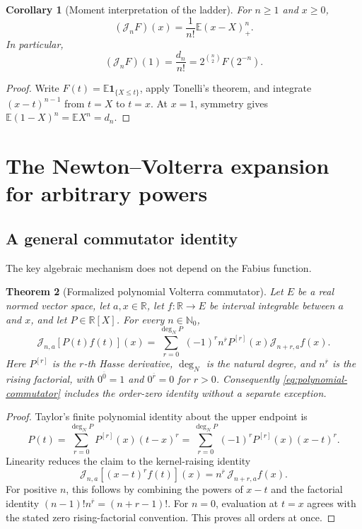 \documentclass[11pt,oneside]{article}
\newtheorem{theorem}{Theorem}[section]
\newtheorem{corollary}[theorem]{Corollary}
\theoremstyle{definition}
\theoremstyle{remark}
\newcommand{\E}{\mathbb E}
\newcommand{\R}{\mathbb R}
\newcommand{\N}{\mathbb N}
\newcommand{\rise}[2]{#1^{\overline{#2}}}
\newcommand{\Jn}{\mathcal J}
\newcommand{\1}{\mathbf 1}
\begin{document}
\begin{corollary}[Moment interpretation of the ladder]\label{cor:J-moment}
For \(n\geq1\) and \(x\geq0\),
\begin{equation}
 (\Jn_nF)(x)=\frac1{n!}\E (x-X)_+^n.                            \label{eq:J-stoploss}
\end{equation}
In particular,
\begin{equation}
 (\Jn_nF)(1)=\frac{d_n}{n!}
 =2^{\binom n2}F(2^{-n}).                                      \label{eq:J-one}
\end{equation}
\end{corollary}

\begin{proof}
Write \(F(t)=\E\1_{\{X\leq t\}}\), apply Tonelli's theorem, and integrate
\((x-t)^{n-1}\) from \(t=X\) to \(t=x\).  At \(x=1\), symmetry gives
\(\E(1-X)^n=\E X^n=d_n\).
\end{proof}

\section{The Newton--Volterra expansion for arbitrary powers}

\subsection{A general commutator identity}
The key algebraic mechanism does not depend on the Fabius function.

\begin{theorem}[Formalized polynomial Volterra commutator]
\label{thm:polynomial-commutator}
Let \(E\) be a real normed vector space, let \(a,x\in\R\), let
\(f:\R\to E\) be interval integrable between \(a\) and \(x\), and let
\(P\in\R[X]\).  For every \(n\in\N_0\),
\begin{equation}
 \boxed{\quad
 \Jn_{n,a}[P(t)f(t)](x)
 =\sum_{r=0}^{\deg_{\!N}P}(-1)^r\rise nr P^{[r]}(x)
   \Jn_{n+r,a}f(x).
 \quad}                                                       \label{eq:polynomial-commutator}
\end{equation}
Here \(P^{[r]}\) is the \(r\)-th Hasse derivative,
\(\deg_{\!N}\) is the natural degree, and \(\rise nr\) is the rising
factorial, with \(\rise 00=1\) and \(\rise 0r=0\) for \(r>0\).
Consequently \eqref{eq:polynomial-commutator} includes the order-zero
identity without a separate exception.
\end{theorem}

\begin{proof}
Taylor's finite polynomial identity about the upper endpoint is
\[
 P(t)=\sum_{r=0}^{\deg_{\!N}P}P^{[r]}(x)(t-x)^r
     =\sum_{r=0}^{\deg_{\!N}P}(-1)^rP^{[r]}(x)(x-t)^r.
\]
Linearity reduces the claim to the kernel-raising identity
\[
 \Jn_{n,a}[(x-t)^rf(t)](x)=\rise nr\,\Jn_{n+r,a}f(x).
\]
For positive \(n\), this follows by combining the powers of \(x-t\) and the
factorial identity \((n-1)!\rise nr=(n+r-1)!\).  For \(n=0\), evaluation at
\(t=x\) agrees with the stated zero rising-factorial convention.  This proves
all orders at once.
\end{proof}
\end{document}

